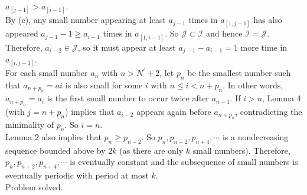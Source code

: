 \documentclass{Math_Note}
\begin{document}
\begin{sol}
{$a_{\left[j-1\right]}>a_{\left[i-1\right]}$. \\
By (c), any small number appearing at least $a_{j-1}$ times in $a_{\left[1,j-1\right]}$ has also appeared $a_{j-1}-1\geq a_{i-1}$ times in $a_{\left[1,i-1\right]}$. So $\mathcal{J}\subset\mathcal{I}$ and hence $\mathcal{I}=\mathcal{J}$. 
Therefore, $a_{i-2}\in\mathcal{J}$, so it must appear at least $a_{j-1}-a_{i-1}=1$ more time in $a_{\left[i,j-1\right]}$. \\
}
\newline
\marginpar{\textcolor{softcyan}{Genius}}
For each small number $a_{n}$ with $n>N^{'}+2$, let $p_{n}$ be the smallest number such that $a_{n+p_{n}}=a{i}$ is also small for some $i$ with $n\leq i<n+p_{n}$. In other words, $a_{n+p_{n}}=a_{i}$ is the first small number to 
occur twice after $a_{n-1}$. If $i>n$, Lemma 4 (with $j=n+p_{n}$) implies that $a_{i-2}$ appears again before $a_{n+p_{n}}$, contradicting the minimality of $p_{n}$. So $i=n$. \\
Lemma 2 also implies that $p_{n}\geq p_{n-2}$. So $p_{n}, p_{n+2}, p_{n+4}, \cdots$ is a nondecreasing sequence bounded above by $2k$ (as there are only $k$ small numbers). Therefore, $p_{n}, p_{n+2}, p_{n+4}, \cdots$ is eventually 
constant and the subsequence of small numbers is eventually periodic with period at most $k$. \\
\newline
Problem solved. 
\end{sol}

\newpage
\end{document}
